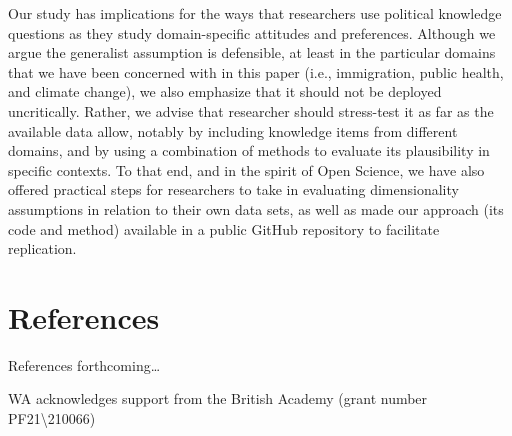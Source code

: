 \documentclass[11pt,halfline,a4paper,]{ouparticle}
\begin{document}
Our study has implications for the ways that researchers use political
knowledge questions as they study domain-specific attitudes and
preferences. Although we argue the generalist assumption is defensible,
at least in the particular domains that we have been concerned with in
this paper (i.e., immigration, public health, and climate change), we
also emphasize that it should not be deployed uncritically. Rather, we
advise that researcher should stress-test it as far as the available
data allow, notably by including knowledge items from different domains,
and by using a combination of methods to evaluate its plausibility in
specific contexts. To that end, and in the spirit of Open Science, we
have also offered practical steps for researchers to take in evaluating
dimensionality assumptions in relation to their own data sets, as well
as made our approach (its code and method) available in a public GitHub
repository to facilitate replication.

\hypertarget{references}{%
\section{References}\label{references}}

References forthcoming\ldots{}


\begin{notes}[Acknowledgements]
WA acknowledges support from the British Academy (grant number
PF21\textbackslash210066)
\end{notes}
\end{document}
